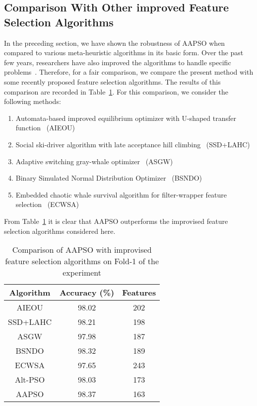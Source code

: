 \documentclass[final,3p,times]{elsarticle}
\begin{document}
\subsection{Comparison With Other improved Feature Selection Algorithms}
\label{ss:impfs}
{In the preceding section, we have shown the robustness of AAPSO when compared to {various} meta-heuristic algorithms {in its basic form}. Over the past few years, researchers have also improved the algorithms to {handle} specific problems~\cite{yuan2016ttsa,kar2020fuzzy}. Therefore, {for a fair} comparison, we compare the present method with some recently proposed feature selection algorithms. The results of this comparison are recorded in Table~\ref{tab:dfsi}. {For this comparison,} we consider the following methods:
\begin{enumerate}
    \item Automata-based improved equilibrium optimizer with U-shaped transfer function~\cite{ahmed2021aieou} (AIEOU)
    \item Social ski-driver algorithm with late acceptance hill climbing~\cite{chatterjee2020late} (SSD+LAHC)
\item Adaptive switching gray-whale optimizer~\cite{mafarja2020efficient} (ASGW)
    \item Binary Simulated Normal Distribution Optimizer~\cite{ahmed2022binary} (BSNDO)
\item Embedded chaotic whale survival algorithm for filter-wrapper feature selection~\cite{guha2020embedded} (ECWSA)
\end{enumerate}
From Table~\ref{tab:dfsi} it is clear that AAPSO outperforms the improvised feature selection algorithms considered here.}
\begin{table}[ht!]
    \centering
    \caption{Comparison of AAPSO with improvised feature selection algorithms on Fold-1 of the experiment}
    \begin{tabular}{c|cc}
    \toprule
        Algorithm & Accuracy (\%) & Features \\
        \midrule
       AIEOU & 98.02 & 202\\
       SSD+LAHC	& 98.21 & 198\\
ASGW & 97.98 & 187\\
       BSNDO & 98.32 & 189\\
ECWSA & 97.65 & 243\\
       \midrule
       Alt-PSO & 98.03 & 173\\
       AAPSO & 98.37 & 163\\
       \bottomrule
    \end{tabular}
    
    \label{tab:dfsi}
\end{table}
\end{document}
